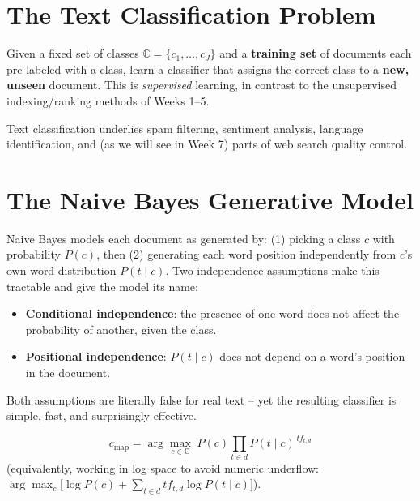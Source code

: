 \documentclass[11pt, a4paper]{article}
\begin{document}
\section{The Text Classification Problem}

\begin{defbox}
Given a fixed set of classes $\mathbb{C} = \{c_1,\dots,c_J\}$ and a \textbf{training set} of documents each pre-labeled with a class, learn a classifier that assigns the correct class to a \textbf{new, unseen} document. This is \emph{supervised} learning, in contrast to the unsupervised indexing/ranking methods of Weeks 1--5.
\end{defbox}

Text classification underlies spam filtering, sentiment analysis, language identification, and (as we will see in Week 7) parts of web search quality control.

\section{The Naive Bayes Generative Model}

\begin{defbox}
Naive Bayes models each document as generated by: (1) picking a class $c$ with probability $P(c)$, then (2) generating each word position independently from $c$'s own word distribution $P(t\mid c)$. Two independence assumptions make this tractable and give the model its name:
\begin{itemize}
  \item \textbf{Conditional independence}: the presence of one word does not affect the probability of another, given the class.
  \item \textbf{Positional independence}: $P(t\mid c)$ does not depend on a word's position in the document.
\end{itemize}
Both assumptions are literally false for real text -- yet the resulting classifier is simple, fast, and surprisingly effective.
\end{defbox}

\begin{formulabox}
\[
c_{\text{map}} = \arg\max_{c \in \mathbb{C}} \; P(c) \prod_{t \in d} P(t\mid c)^{\,tf_{t,d}}
\]
(equivalently, working in log space to avoid numeric underflow: $\arg\max_c \big[\log P(c) + \sum_{t\in d} tf_{t,d}\log P(t\mid c)\big]$).
\end{formulabox}
\end{document}
